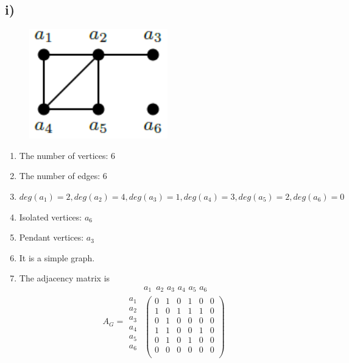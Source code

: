 \documentclass[a4paper,12pt,titlepage]{article}
\begin{document}
\subsection*{i)}
\begin{figure}[H]
    \centering
    \includegraphics[width=6cm]{1.png}
\end{figure}
\begin{enumerate}
\item The number of vertices: 6
\item The number of edges: 6
\item $deg(a_1)=2,deg(a_2)=4,deg(a_3)=1,deg(a_4)=3,deg(a_5)=2,deg(a_6)=0$
\item Isolated vertices: $a_6$
\item Pendant vertices: $a_3$
\item It is a simple graph.
\item The adjacency matrix is
\begin{equation*} 
A_G=\begin{array}{c}
\\
a_1\\
a_2\\
a_3\\
a_4\\
a_5\\
a_6
\end{array} 
\begin{array}{c}   
    a_1\,\,\, a_2 \,\, a_3 \,\, a_4 \,\, a_5 \,\, a_6 \\
  \left(                 
  \begin{array}{cccccc}   
    0 & 1 & 0 & 1 & 0 & 0\\  
    1 & 0 & 1 & 1 & 1 & 0\\
    0 & 1 & 0 & 0 & 0 & 0\\
    1 & 1 & 0 & 0 & 1 & 0\\
    0 & 1 & 0 & 1 & 0 & 0\\
    0 & 0 & 0 & 0 & 0 & 0\\
  \end{array}
\right)  
\end{array}   
\end{equation*}
\end{enumerate}
\end{document}
